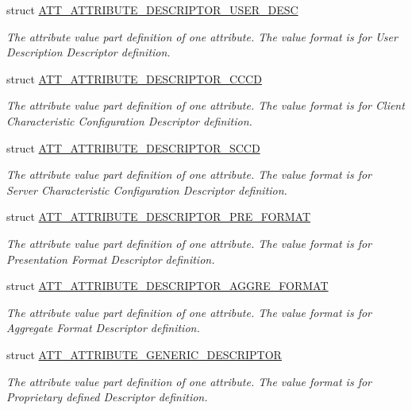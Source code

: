 \begin{DoxyCompactItemize}
struct \hyperlink{struct_a_t_t___a_t_t_r_i_b_u_t_e___d_e_s_c_r_i_p_t_o_r___u_s_e_r___d_e_s_c}{A\+T\+T\+\_\+\+A\+T\+T\+R\+I\+B\+U\+T\+E\+\_\+\+D\+E\+S\+C\+R\+I\+P\+T\+O\+R\+\_\+\+U\+S\+E\+R\+\_\+\+D\+E\+SC}
\begin{DoxyCompactList}\small\item\em The attribute value part definition of one attribute. The value format is for User Description Descriptor definition. \end{DoxyCompactList}\item 
struct \hyperlink{struct_a_t_t___a_t_t_r_i_b_u_t_e___d_e_s_c_r_i_p_t_o_r___c_c_c_d}{A\+T\+T\+\_\+\+A\+T\+T\+R\+I\+B\+U\+T\+E\+\_\+\+D\+E\+S\+C\+R\+I\+P\+T\+O\+R\+\_\+\+C\+C\+CD}
\begin{DoxyCompactList}\small\item\em The attribute value part definition of one attribute. The value format is for Client Characteristic Configuration Descriptor definition. \end{DoxyCompactList}\item 
struct \hyperlink{struct_a_t_t___a_t_t_r_i_b_u_t_e___d_e_s_c_r_i_p_t_o_r___s_c_c_d}{A\+T\+T\+\_\+\+A\+T\+T\+R\+I\+B\+U\+T\+E\+\_\+\+D\+E\+S\+C\+R\+I\+P\+T\+O\+R\+\_\+\+S\+C\+CD}
\begin{DoxyCompactList}\small\item\em The attribute value part definition of one attribute. The value format is for Server Characteristic Configuration Descriptor definition. \end{DoxyCompactList}\item 
struct \hyperlink{struct_a_t_t___a_t_t_r_i_b_u_t_e___d_e_s_c_r_i_p_t_o_r___p_r_e___f_o_r_m_a_t}{A\+T\+T\+\_\+\+A\+T\+T\+R\+I\+B\+U\+T\+E\+\_\+\+D\+E\+S\+C\+R\+I\+P\+T\+O\+R\+\_\+\+P\+R\+E\+\_\+\+F\+O\+R\+M\+AT}
\begin{DoxyCompactList}\small\item\em The attribute value part definition of one attribute. The value format is for Presentation Format Descriptor definition. \end{DoxyCompactList}\item 
struct \hyperlink{struct_a_t_t___a_t_t_r_i_b_u_t_e___d_e_s_c_r_i_p_t_o_r___a_g_g_r_e___f_o_r_m_a_t}{A\+T\+T\+\_\+\+A\+T\+T\+R\+I\+B\+U\+T\+E\+\_\+\+D\+E\+S\+C\+R\+I\+P\+T\+O\+R\+\_\+\+A\+G\+G\+R\+E\+\_\+\+F\+O\+R\+M\+AT}
\begin{DoxyCompactList}\small\item\em The attribute value part definition of one attribute. The value format is for Aggregate Format Descriptor definition. \end{DoxyCompactList}\item 
struct \hyperlink{struct_a_t_t___a_t_t_r_i_b_u_t_e___g_e_n_e_r_i_c___d_e_s_c_r_i_p_t_o_r}{A\+T\+T\+\_\+\+A\+T\+T\+R\+I\+B\+U\+T\+E\+\_\+\+G\+E\+N\+E\+R\+I\+C\+\_\+\+D\+E\+S\+C\+R\+I\+P\+T\+OR}
\begin{DoxyCompactList}\small\item\em The attribute value part definition of one attribute. The value format is for Proprietary defined Descriptor definition. \end{DoxyCompactList}\end{DoxyCompactItemize}
